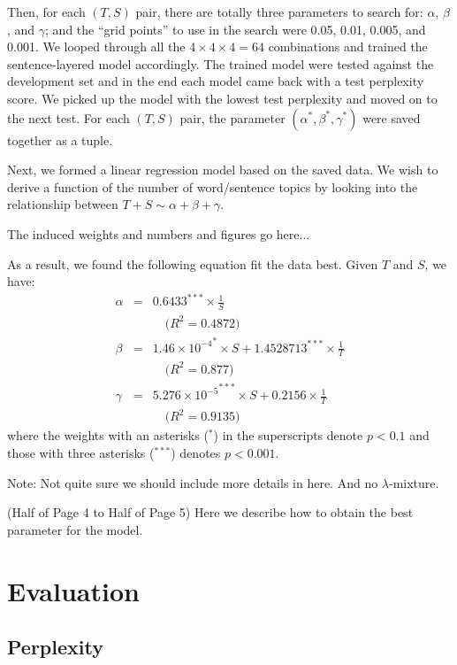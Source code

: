 Then, for each $(T, S)$ pair, there are totally three parameters to search for:
$\alpha$, $\beta$, and $\gamma$; and the ``grid points'' to use in the search
were 0.05, 0.01, 0.005, and 0.001.  We looped through all the $4 \times 4
\times 4 = 64$ combinations and trained the sentence-layered model accordingly.
The trained model were tested against the development set and in the end each
model came back with a test perplexity score.  We picked up the model with the
lowest test perplexity and moved on to the next test.  For each $(T, S)$ pair,
the parameter $(\alpha^*, \beta^*, \gamma^*)$ were saved together as a tuple.

Next, we formed a linear regression model based on the saved data.  We wish to
derive a function of the number of word/sentence topics by looking into the
relationship between $T + S \sim \alpha + \beta + \gamma$.  

{ \color{red} The induced weights and numbers and figures go here... }

As a result, we found the following equation fit the data best.  Given $T$ and
$S$, we have:
\begin{eqnarray*}
  \alpha &=& 0.6433^{***} \times \frac{1}{S} \\
  && \quad \textrm{($R^2 = 0.4872$)} \nonumber\\
  \beta &=& 1.46 \times {10^{-4}}^{*} \times S + 1.4528713^{***} \times \frac{1}{T} \\
  && \quad \textrm{($R^2 = 0.877$)} \nonumber\\
  \gamma &=& 5.276 \times {10^{-5}}^{***} \times S + 0.2156 \times \frac{1}{T} \\
  && \quad \textrm{($R^2 = 0.9135$)} \nonumber
\end{eqnarray*}
where the weights with an asterisks ($^*$) in the superscripts denote $p < 0.1$ and
those with three asterisks ($^{***}$) denotes $p < 0.001$.

{ \color{red} Note: Not quite sure we should include more details in here.  And no $\lambda$-mixture. }

{ \color{red} (Half of Page 4 to Half of Page 5) Here we
describe how to obtain the best parameter for the model. }

\section{Evaluation}
\subsection{Perplexity}


